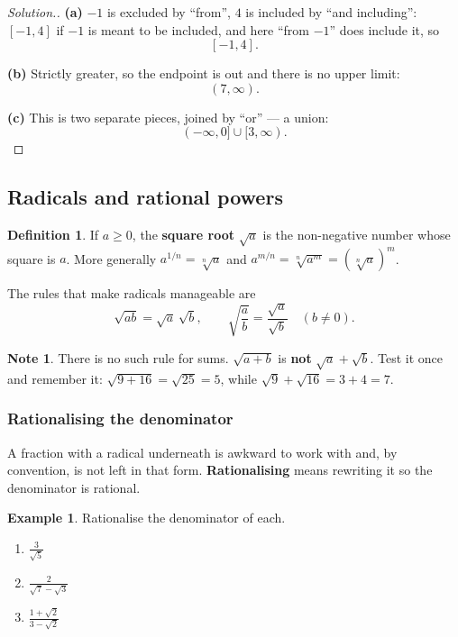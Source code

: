 \documentclass[11pt,a4paper]{article}
\theoremstyle{definition}
\newtheorem{definition}[thm]{Definition}
\newtheorem{example}[thm]{Example}
\newtheorem{note}[thm]{Note}
\newenvironment{solution}
  {\renewcommand{\qedsymbol}{}\begin{proof}[\textit{Solution}.]}
  {\end{proof}}
\begin{document}
\begin{solution}
\textbf{(a)} $-1$ is excluded by ``from'', $4$ is included by ``and including'':
$[-1,4]$ if $-1$ is meant to be included, and here ``from $-1$'' does include it, so
$$[-1,4].$$

\textbf{(b)} Strictly greater, so the endpoint is out and there is no upper limit:
$$(7,\infty).$$

\textbf{(c)} This is two separate pieces, joined by ``or'' --- a union:
$$(-\infty,0]\cup[3,\infty).$$
\end{solution}

\subsection{Radicals and rational powers}

\begin{definition}
If $a\geq 0$, the \textbf{square root} $\sqrt{a}$ is the non-negative number whose
square is $a$. More generally $a^{1/n}=\sqrt[n]{a}$ and
$a^{m/n}=\sqrt[n]{a^m}=\left(\sqrt[n]{a}\right)^m$.
\end{definition}

The rules that make radicals manageable are
$$\sqrt{ab}=\sqrt{a}\,\sqrt{b},\qquad \sqrt{\frac{a}{b}}=\frac{\sqrt{a}}{\sqrt{b}}
\quad (b\neq 0).$$

\begin{note}
There is no such rule for sums. $\sqrt{a+b}$ is \textbf{not} $\sqrt{a}+\sqrt{b}$. Test
it once and remember it: $\sqrt{9+16}=\sqrt{25}=5$, while $\sqrt{9}+\sqrt{16}=3+4=7$.
\end{note}

\subsubsection{Rationalising the denominator}

A fraction with a radical underneath is awkward to work with and, by convention, is
not left in that form. \textbf{Rationalising} means rewriting it so the denominator is
rational.

\begin{example}
Rationalise the denominator of each.
\begin{enumerate}
\item[(a).] $\frac{3}{\sqrt{5}}$
\item[(b).] $\frac{2}{\sqrt{7}-\sqrt{3}}$
\item[(c).] $\frac{1+\sqrt{2}}{3-\sqrt{2}}$
\end{enumerate}
\end{example}
\end{document}
